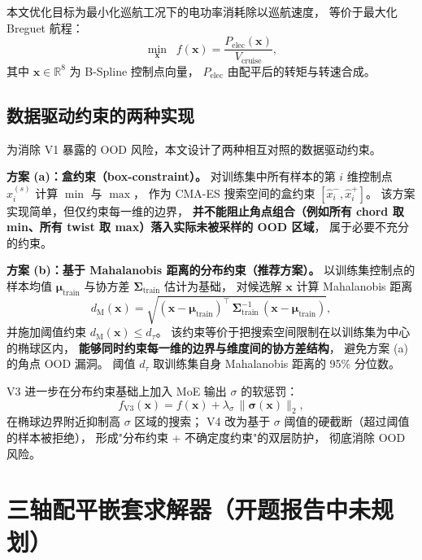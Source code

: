 本文优化目标为最小化巡航工况下的电功率消耗除以巡航速度，
等价于最大化 Breguet 航程：
\begin{equation}
\min_{\mathbf{x}} \;\;f(\mathbf{x}) = \frac{P_{\text{elec}}(\mathbf{x})}{V_{\text{cruise}}},
\end{equation}
其中 $\mathbf{x} \in \mathbb{R}^8$ 为 B-Spline 控制点向量，
$P_{\text{elec}}$ 由配平后的转矩与转速合成。

\subsection{数据驱动约束的两种实现}

为消除 V1 暴露的 OOD 风险，本文设计了两种相互对照的数据驱动约束。

\textbf{方案 (a)：盒约束（box-constraint）。}
对训练集中所有样本的第 $i$ 维控制点 $x_i^{(s)}$ 计算 $\min$ 与 $\max$，
作为 CMA-ES 搜索空间的盒约束 $[\hat x_i^-, \hat x_i^+]$。
该方案实现简单，但仅约束每一维的边界，
\textbf{并不能阻止角点组合（例如所有 chord 取 min、所有 twist 取 max）落入实际未被采样的 OOD 区域}，
属于必要不充分的约束。

\textbf{方案 (b)：基于 Mahalanobis 距离的分布约束（推荐方案）。}
以训练集控制点的样本均值 $\boldsymbol{\mu}_{\text{train}}$ 与协方差 $\boldsymbol{\Sigma}_{\text{train}}$ 估计为基础，
对候选解 $\mathbf{x}$ 计算 Mahalanobis 距离
\begin{equation}
d_{\text{M}}(\mathbf{x}) = \sqrt{(\mathbf{x} - \boldsymbol{\mu}_{\text{train}})^{\top}\,\boldsymbol{\Sigma}_{\text{train}}^{-1}\,(\mathbf{x} - \boldsymbol{\mu}_{\text{train}})},
\end{equation}
并施加阈值约束 $d_{\text{M}}(\mathbf{x}) \leq d_\tau$。
该约束等价于把搜索空间限制在以训练集为中心的椭球区内，
\textbf{能够同时约束每一维的边界与维度间的协方差结构}，
避免方案 (a) 的角点 OOD 漏洞。
阈值 $d_\tau$ 取训练集自身 Mahalanobis 距离的 95\% 分位数。

V3 进一步在分布约束基础上加入 MoE 输出 $\sigma$ 的软惩罚：
\begin{equation}
f_{\text{V3}}(\mathbf{x}) = f(\mathbf{x}) + \lambda_\sigma\,\|\boldsymbol{\sigma}(\mathbf{x})\|_2,
\end{equation}
在椭球边界附近抑制高 $\sigma$ 区域的搜索；
V4 改为基于 $\sigma$ 阈值的硬截断（超过阈值的样本被拒绝），
形成"分布约束 + 不确定度约束"的双层防护，
彻底消除 OOD 风险。

\section{三轴配平嵌套求解器（开题报告中未规划）}

